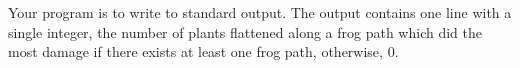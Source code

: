 Your program is to write to standard output. The output contains one line with a single integer, the number of plants flattened along a frog path which did the most damage if there exists at least one frog path, otherwise, $0$.